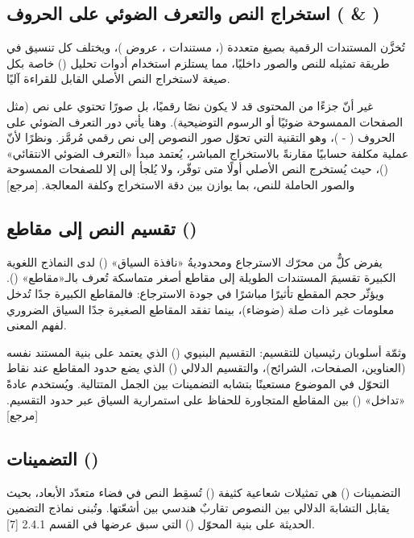 \subsection{استخراج النص والتعرف الضوئي على الحروف ( \& )}
\label{subsec:text-extraction-ocr}

تُخزَّن المستندات الرقمية بصيغ متعددة (، مستندات ، عروض )، ويختلف كل تنسيق في طريقة تمثيله للنص والصور داخليًا، مما يستلزم استخدام أدوات تحليل () خاصة بكل صيغة لاستخراج النص الأصلي القابل للقراءة آليًا.

غير أنّ جزءًا من المحتوى قد لا يكون نصًا رقميًا، بل صورًا تحتوي على نص (مثل الصفحات الممسوحة ضوئيًا أو الرسوم التوضيحية). وهنا يأتي دور التعرف الضوئي على الحروف ( - )، وهو التقنية التي تحوّل صور النصوص إلى نص رقمي مُرمَّز. ونظرًا لأنّ عملية  مكلفة حسابيًا مقارنةً بالاستخراج المباشر، يُعتمد مبدأ «التعرف الضوئي الانتقائي» ()، حيث يُستخرج النص الأصلي أولًا متى توفّر، ولا يُلجأ إلى  إلا للصفحات الممسوحة والصور الحاملة للنص، بما يوازن بين دقة الاستخراج وكلفة المعالجة. [مرجع]

\subsection{تقسيم النص إلى مقاطع ()}

يفرض كلٌّ من محرّك الاسترجاع ومحدوديةُ «نافذة السياق» () لدى النماذج اللغوية الكبيرة تقسيمَ المستندات الطويلة إلى مقاطع أصغر متماسكة تُعرف بالـ«مقاطع» (). ويؤثّر حجم المقطع تأثيرًا مباشرًا في جودة الاسترجاع: فالمقاطع الكبيرة جدًا تُدخل معلومات غير ذات صلة (ضوضاء)، بينما تفقد المقاطع الصغيرة جدًا السياق الضروري لفهم المعنى.

وثمّة أسلوبان رئيسيان للتقسيم: التقسيم البنيوي () الذي يعتمد على بنية المستند نفسه (العناوين، الصفحات، الشرائح)، والتقسيم الدلالي () الذي يضع حدود المقاطع عند نقاط التحوّل في الموضوع مستعينًا بتشابه التضمينات بين الجمل المتتالية. ويُستخدم عادةً «تداخل» () بين المقاطع المتجاورة للحفاظ على استمرارية السياق عبر حدود التقسيم. [مرجع]

\subsection{التضمينات ()}

التضمينات () هي تمثيلات شعاعية كثيفة () تُسقِط النص في فضاء متعدّد الأبعاد، بحيث يقابل التشابهَ الدلالي بين النصوص تقاربٌ هندسي بين أشعّتها. وتُبنى نماذج التضمين الحديثة على بنية المحوّل () التي سبق عرضها في القسم 2.4.1 [7].


